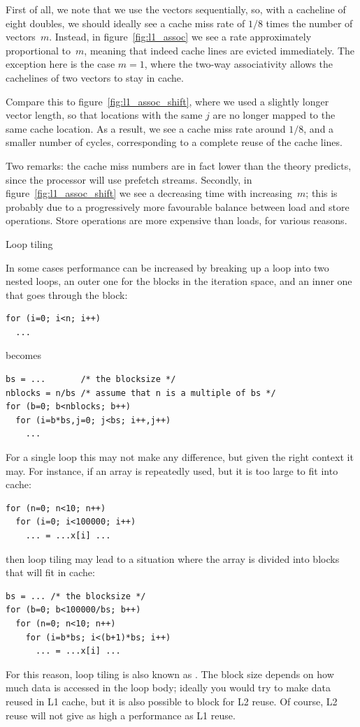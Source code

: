 First of all, we note that we use the vectors sequentially, so, with a
cacheline of eight doubles, we should ideally see a cache miss rate of
$1/8$ times the number of vectors~$m$. Instead, in
figure~\ref{fig:l1_assoc} we see a rate approximately proportional
to~$m$, meaning that indeed cache lines are evicted immediately. The
exception here is the case $m=1$, where the two-way associativity
allows the cachelines of two vectors to stay in cache.

Compare this to figure~\ref{fig:l1_assoc_shift}, where we used a
slightly longer vector length, so that locations with the same $j$ are
no longer mapped to the same cache location. As a result, we see a
cache miss rate around $1/8$, and a smaller number of cycles,
corresponding to a complete reuse of the cache lines. 

Two remarks: the cache miss numbers are in fact lower than the theory
predicts, since the processor will use prefetch streams. Secondly, in
figure~\ref{fig:l1_assoc_shift} we see a decreasing time with
increasing~$m$; this is probably due to a progressively more
favourable balance between load and store operations. Store operations
are more expensive than loads, for various reasons.

 {Loop tiling}
\label{sec:loop-tiling}

In some cases performance can be increased by breaking up a loop into
two nested loops, an outer one for the blocks in the iteration space,
and an inner one that goes through the block:
\begin{verbatim}
for (i=0; i<n; i++)
  ...
\end{verbatim}
becomes
\begin{verbatim}
bs = ...       /* the blocksize */
nblocks = n/bs /* assume that n is a multiple of bs */
for (b=0; b<nblocks; b++)
  for (i=b*bs,j=0; j<bs; i++,j++)
    ...
\end{verbatim}
For a single loop this may not make any difference, but given the
right context it may. For instance, if an array is repeatedly used,
but it is too large to fit into cache:
\begin{verbatim}
for (n=0; n<10; n++)
  for (i=0; i<100000; i++)
    ... = ...x[i] ...

\end{verbatim}
then loop tiling may lead to a situation where the array is divided
into blocks that will fit in cache:
\begin{verbatim}
bs = ... /* the blocksize */
for (b=0; b<100000/bs; b++)
  for (n=0; n<10; n++)
    for (i=b*bs; i<(b+1)*bs; i++)
      ... = ...x[i] ...
\end{verbatim}
For this reason, loop tiling is also known as
. The block size depends on how much
data is accessed in the loop body; ideally you would try to make data
reused in L1 cache, but it is also possible to block for L2 reuse. Of
course, L2 reuse will not give as high a performance as L1 reuse.

